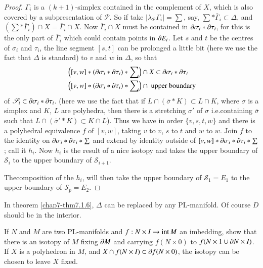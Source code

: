 \begin{proof}
$\Gamma_{i}$ is a $(k+1)$-simplex contained in the complement of $X$, which is also covered by a subpresentation of $\mathscr{P}$. So if take $|\lambda_{\mathscr{P}}\Gamma_{i}|=\sum$, say, $\sum\ast \overline{\Gamma}_{i}\subset \Delta$, and $(\sum\ast\overline{\Gamma}_{i})\cap X=\overline{\Gamma}_{i}\cap X$. Now $\overline{\Gamma}_{i}\cap X$ must be contained in $\partial \sigma_{i}\ast \partial \tau_{i}$, for this is the only part of $\overline{\Gamma}_{i}$ which could contain points in $\partial E_{i}$. Let $s$ and $t$ be the centres of $\sigma_{i}$ and $\tau_{i}$, the line segment $[s,t]$ can be prolonged a little bit (here we use the fact that $\Delta$ is standard) to $v$ and $w$ in $\Delta$, so that
\begin{align*}
& \left([v,w]\ast(\partial \sigma_{i}\ast\partial\tau_{i})\ast\sum\right)\cap X\subset \partial \sigma_{i}\ast\partial \tau_{i}\\
& \left([v,w]\ast (\partial \sigma_{i}\ast \partial \tau_{i})\ast \sum\right)\cap\text{~ upper boundary}
\end{align*}
of $\mathscr{S}_{i}\subset \partial \sigma_{i}\ast \partial \tau_{i}$. (here we use the fact that if $L\cap (\overline{\sigma}\ast K)\subset L\cap K$, where $\sigma$ is a simplex and $K$, $L$ are polyhedra, then there is a stretching $\sigma'$ of $\sigma$ i.e.\@ containing $\overline{\sigma}$ such that $L\cap (\overline{\sigma}'\ast K)\subset K\cap L$). Thus we have in order $\{v,s,t,w\}$ and there is a polyhedral equivalence $f$ of $[v,w]$, taking $v$ to $v$, $s$ to $t$ and $w$ to $w$. Join $f$ to the identity on $\partial \sigma_{i}\ast \partial \tau_{i}\ast\sum$ and extend by identity outside of $[v,w]\ast \partial \sigma_{i}\ast \partial \tau_{i}\ast\sum$; call it $h_{i}$. Now $h_{i}$ is the result of a nice isotopy and takes the upper boundary of $\mathscr{S}_{i}$ to the upper boundary of $\mathscr{S}_{i+1}$.

The\pageoriginale composition of the $h_{i}$, will then take the upper boundary of $\mathscr{S}_{1}=E_{1}$ to the upper boundary of $\mathscr{S}_{p}=E_{2}$.
\end{proof}

\begin{remark}\label{chap7-rem7.1.7}
In theorem \ref{chap7-thm7.1.6}, $\Delta$ can be replaced by any PL-manifold. Of course $D$ should be in the interior.
\end{remark}

\begin{ex}\label{chap7-ex7.1.8}
If $N$ and $M$ are two PL-manifolds and $f:N\times I\to \text{int\,}M$ an imbedding, show that there is an isotopy of $M$ fixing $\partial M$ and carrying $f(N\times 0)$ to $f(N\times 1\cup \partial N\times I)$. If $X$ is a polyhedron in $M$, and $X\cap f(N\times I)\subset \partial f(N\times 0)$, the isotopy can be chosen to leave $X$ fixed.
\end{ex}

